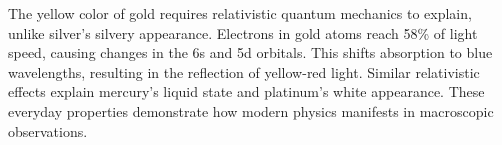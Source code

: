 The yellow color of gold requires relativistic quantum mechanics to explain, unlike silver's silvery appearance. Electrons in gold atoms reach 58\% of light speed, causing changes in the 6s and 5d orbitals. This shifts absorption to blue wavelengths, resulting in the reflection of yellow-red light. Similar relativistic effects explain mercury's liquid state and platinum's white appearance. These everyday properties demonstrate how modern physics manifests in macroscopic observations.
